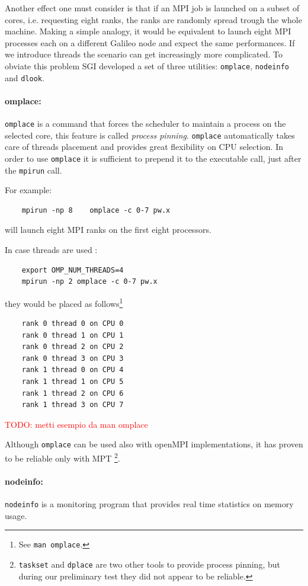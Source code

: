 \documentclass[a4paper,12pt]{article}
\newcommand\mynotes[1]{\begin{flushright}

\textcolor{red}{TODO: #1}\end{flushright}}
\begin{document}
Another effect one must consider is that if an MPI job is launched on a subset of cores, i.e. requesting eight ranks, the ranks are randomly spread trough the whole machine.
Making a simple analogy, it would be equivalent to launch eight MPI processes each on a different Galileo node and expect the same performances.
If we introduce threads the scenario can get increasingly more complicated.
To obviate this problem SGI developed a set of three utilities: \texttt{omplace}, \texttt{nodeinfo} and \texttt{dlook}.

\paragraph{omplace:} \texttt{omplace} is a command that forces the scheduler to maintain a process on the selected core, this feature is called \textit{process pinning}. 
\texttt{omplace} automatically takes care of threads placement and provides great flexibility on CPU selection.
In order to use \texttt{omplace} it is sufficient to prepend it to the executable call, just after the \texttt{mpirun} call.

For example:
\begin{verbatim}
	mpirun -np 8 	omplace -c 0-7 pw.x
\end{verbatim}
will launch eight MPI ranks on the first eight processors.

In case threads are used :
\begin{verbatim}
	export OMP_NUM_THREADS=4
	mpirun -np 2 omplace -c 0-7 pw.x	
\end{verbatim}
they would be placed as follows\footnote{See \texttt{man omplace}.}
\begin{verbatim}
    rank 0 thread 0 on CPU 0
    rank 0 thread 1 on CPU 1
    rank 0 thread 2 on CPU 2
    rank 0 thread 3 on CPU 3
    rank 1 thread 0 on CPU 4
    rank 1 thread 1 on CPU 5
    rank 1 thread 2 on CPU 6
    rank 1 thread 3 on CPU 7
\end{verbatim}
\mynotes{metti esempio da man omplace}

Although \texttt{omplace} can be used also with openMPI implementations, it has proven to be reliable only with MPT
\footnote{\texttt{taskset} and \texttt{dplace} are two other tools to provide process pinning, but during our preliminary test they did not appear to be reliable.}.

\paragraph{nodeinfo:}\texttt{nodeinfo} is a monitoring program that provides real time statistics on memory usage.
\end{document}
